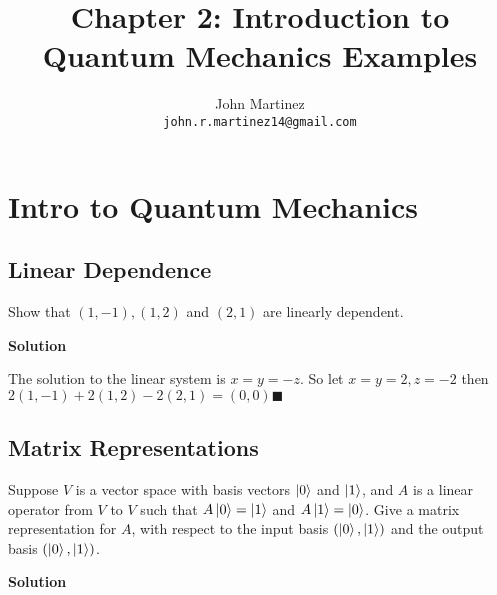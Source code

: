 \documentclass{article}
\title{Chapter 2: Introduction to Quantum Mechanics Examples}
\author{
  John Martinez \\
  \texttt{john.r.martinez14@gmail.com} \\
}
\begin{document}
\maketitle

\section{Intro to Quantum Mechanics}
\subsection{Linear Dependence}
Show that $(1, -1), (1, 2)$ and $(2, 1)$ are linearly dependent.

\textbf{Solution}

The solution to the linear system is $x = y = -z$.  So let
$x = y = 2, z = -2$ then $ 2(1, -1) + 2(1, 2) - 2(2, 1) = (0, 0)\blacksquare$

\subsection{Matrix Representations}
Suppose $V$ is a vector space with basis vectors $\ket{0}$ and $\ket{1}$, and
$A$ is a linear operator from $V$ to $V$ such that $A\ket{0} = \ket{1}$
and $A\ket{1} = \ket{0}$. Give a matrix representation for $A$, with respect
to the input basis $(\ket{0}, \ket{1})$ and the output basis
$(\ket{0}, \ket{1})$.

\textbf{Solution}
\end{document}
